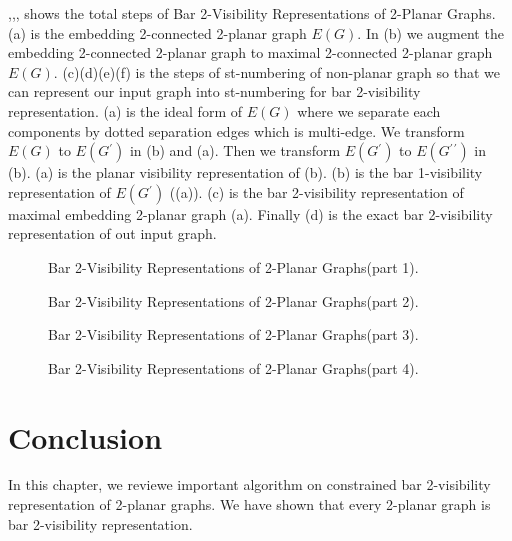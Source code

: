 ,,, shows the total steps of Bar 2-Visibility Representations of 2-Planar Graphs. (a) is the embedding 2-connected 2-planar graph $E(G)$. In (b) we augment the embedding 2-connected 2-planar graph to maximal 2-connected 2-planar graph $E(G)$. (c)(d)(e)(f) is the steps of st-numbering of non-planar graph so that we can represent our input graph into st-numbering for bar 2-visibility representation. (a) is the ideal form of $E(G)$ where we separate each components by dotted separation edges which is multi-edge. We transform $E(G)$ to $E(G{^\prime})$ in (b) and (a). Then we transform $E(G{^\prime})$ to $E(G{^\prime}{^\prime})$ in (b).  (a) is the planar visibility representation of  (b). (b) is the bar 1-visibility representation of $E(G{^\prime})$ ((a)). (c) is the bar 2-visibility representation of maximal embedding 2-planar graph (a). Finally  (d) is the exact bar 2-visibility representation of out input graph.


\begin{figure}[!tb]
\centering
\resizebox{150mm}{!}{}
\caption{Bar 2-Visibility Representations of 2-Planar Graphs(part 1).}
\label{fig:2p2v}
\end{figure}

\begin{figure}[!tb]
\centering
\resizebox{150mm}{!}{}
\caption{Bar 2-Visibility Representations of 2-Planar Graphs(part 2).}
\label{fig:2p2v1}
\end{figure}




\begin{figure}[!tb]
\centering
\resizebox{150mm}{!}{}
\caption{Bar 2-Visibility Representations of 2-Planar Graphs(part 3).}
\label{fig:2p2v11}
\end{figure}

\begin{figure}[!tb]
\centering
\resizebox{150mm}{!}{}
\caption{Bar 2-Visibility Representations of 2-Planar Graphs(part 4).}
\label{fig:2p2v2}
\end{figure}




\section{Conclusion}
In this chapter, we reviewe important algorithm on constrained bar 2-visibility representation of 2-planar graphs. We have shown that every 2-planar graph is bar 2-visibility representation.






\endinput
